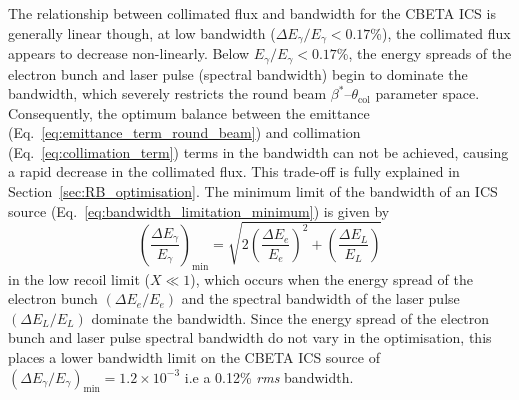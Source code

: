 \documentclass[../main.tex]{subfiles}
\begin{document}
The relationship between collimated flux and bandwidth for the CBETA ICS is generally linear though, at low bandwidth ($\Delta E_{\gamma}/E_{\gamma}<0.17$\%), the collimated flux appears to decrease non-linearly. Below $E_{\gamma}/E_{\gamma}<0.17$\%, the energy spreads of the electron bunch and laser pulse (spectral bandwidth) begin to dominate the bandwidth, which severely restricts the round beam $\beta^{*}$--$\theta_{\mathrm{col}}$ parameter space. Consequently, the optimum balance between the emittance (Eq.~\ref{eq:emittance_term_round_beam}) and collimation (Eq.~\ref{eq:collimation_term}) terms in the bandwidth can not be achieved, causing a rapid decrease in the collimated flux. This trade-off is fully explained in Section~\ref{sec:RB_optimisation}. The minimum limit of the bandwidth of an ICS source (Eq.~\ref{eq:bandwidth_limitation_minimum}) is given by
\begin{equation*}
\left(\frac{\Delta E_{\gamma}}{E_{\gamma}}\right)_{\mathrm{min}} = \sqrt{2\left(\frac{\Delta E_{e}}{E_{e}}\right)^{2}+\left(\frac{\Delta E_{L}}{E_{L}}\right)}   
\end{equation*}
in the low recoil limit ($X \ll 1$), which occurs when the energy spread of the electron bunch $\left(\Delta E_{e}/E_{e}\right)$ and the spectral bandwidth of the laser pulse $\left(\Delta E_{L}/E_{L}\right)$ dominate the bandwidth. Since the energy spread of the electron bunch and laser pulse spectral bandwidth do not vary in the optimisation, this places a lower bandwidth limit on the CBETA ICS source of $\left(\Delta E_{\gamma}/E_{\gamma}\right)_{\mathrm{min}}=1.2\times 10^{-3}$ i.e a 0.12\% \textit{rms} bandwidth.
\end{document}
